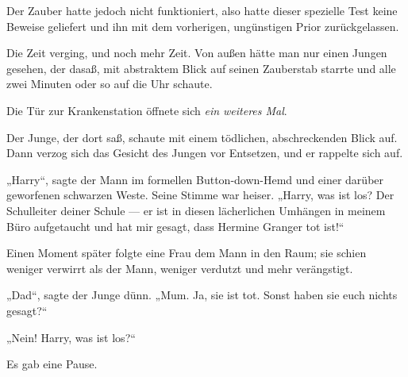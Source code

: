 Der Zauber hatte jedoch nicht funktioniert, also hatte dieser spezielle Test keine Beweise geliefert und ihn mit dem vorherigen, ungünstigen Prior zurückgelassen.

Die Zeit verging, und noch mehr Zeit. Von außen hätte man nur einen Jungen gesehen, der dasaß, mit abstraktem Blick auf seinen Zauberstab starrte und alle zwei Minuten oder so auf die Uhr schaute.

Die Tür zur Krankenstation öffnete sich \emph{ein weiteres Mal}.


Der Junge, der dort saß, schaute mit einem tödlichen, abschreckenden Blick auf. Dann verzog sich das Gesicht des Jungen vor Entsetzen, und er rappelte sich auf.

„Harry“, sagte der Mann im formellen Button-down-Hemd und einer darüber geworfenen schwarzen Weste. Seine Stimme war heiser.
„Harry, was ist los? Der Schulleiter deiner Schule — er ist in diesen lächerlichen Umhängen in meinem Büro aufgetaucht und hat mir gesagt, dass Hermine Granger tot ist!“

Einen Moment später folgte eine Frau dem Mann in den Raum; sie schien weniger verwirrt als der Mann, weniger verdutzt und mehr verängstigt.

„Dad“, sagte der Junge dünn.
„Mum. Ja, sie ist tot. Sonst haben sie euch nichts gesagt?“

„Nein! Harry, was ist los?“

Es gab eine Pause.

